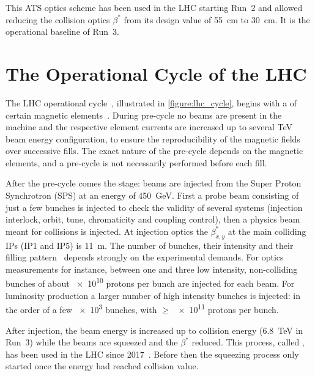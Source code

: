This ATS optics scheme has been used in the LHC starting Run~\num{2} and allowed reducing the collision optics \(\beta^{\ast}\) from its design value of \qty{55}{\centi\meter} to \qty{30}{\centi\meter}.
It is the operational baseline of Run~\num{3}.


\section{The Operational Cycle of the LHC}
\label{section:lhc_operational_cycle}

The LHC operational cycle~\cite{Report:LHCModes}, illustrated in \cref{figure:lhc_cycle}, begins with a  of certain magnetic elements~\cite{Report:LHCMagnetsPreCycles}.
During pre-cycle no beams are present in the machine and the respective element currents are increased up to several \unit{\tera\electronvolt} beam energy configuration, to ensure the reproducibility of the magnetic fields over successive fills.
The exact nature of the pre-cycle depends on the magnetic elements, and a pre-cycle is not necessarily performed before each fill.

After the pre-cycle comes the  stage: beams are injected from the Super Proton Synchrotron (SPS) at an energy of \qty{450}{\giga\electronvolt}.
First a probe beam consisting of just a few bunches is injected to check the validity of several systems (injection interlock, orbit, tune, chromaticity and coupling control), then a physics beam meant for collisions is injected.
At injection optics the \(\beta^{\ast}_{x,y}\) at the main colliding IPs (IP\num{1} and IP\num{5}) is \qty{11}{\metre}.
The number of bunches, their intensity and their filling pattern~\cite{Report:LHCStandardFillingSchemes} depends strongly on the experimental demands.
For optics measurements for instance, between one and three low intensity, non-colliding bunches of about \num{e10} protons per bunch are injected for each beam.
For luminosity production a larger number of high intensity bunches is injected: in the order of a few \num{e3} bunches, with \(\ge\) \num{e11} protons per bunch.

After injection, the beam energy is increased up to collision energy (\qty{6.8}{\tera\electronvolt} in Run~3) while the beams are squeezed and the \(\beta^{\ast}\) reduced.
This process, called , has been used in the LHC since 2017~\cite{IPAC:Camillocci:CombinedRampAndSqueeze}.
Before then the squeezing process only started once the energy had reached collision value.

